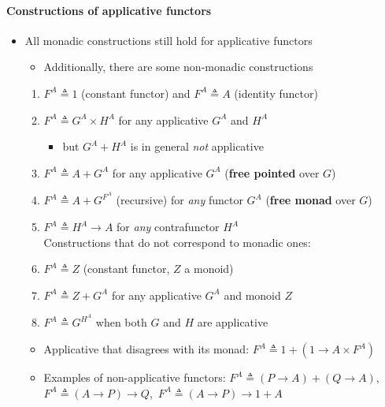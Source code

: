 \paragraph{Constructions of applicative functors}
\begin{itemize}
\item \vspace{-0.10cm}All monadic constructions still hold for applicative
functors
\begin{itemize}
\item Additionally, there are some non-monadic constructions
\end{itemize}
\begin{enumerate}
\item $F^{A}\triangleq1$ (constant functor) and $F^{A}\triangleq A$ (identity
functor)
\item $F^{A}\triangleq G^{A}\times H^{A}$ for any applicative $G^{A}$
and $H^{A}$
\begin{itemize}
\item but $G^{A}+H^{A}$ is in general \emph{not} applicative
\end{itemize}
\item $F^{A}\triangleq A+G^{A}$ for any applicative $G^{A}$ (\textbf{free
pointed} over $G$)
\item $F^{A}\triangleq A+G^{F^{A}}$ (recursive) for \emph{any} functor
$G^{A}$ (\textbf{free monad} over $G$)
\item $F^{A}\triangleq H^{A}\rightarrow A$ for \emph{any} contrafunctor
$H^{A}$\\
Constructions that do not correspond to monadic ones:
\item $F^{A}\triangleq Z$ (constant functor, $Z$ a monoid)
\item $F^{A}\triangleq Z+G^{A}$ for any applicative $G^{A}$ and monoid
$Z$
\item $F^{A}\triangleq G^{H^{A}}$ when both $G$ and $H$ are applicative
\end{enumerate}
\begin{itemize}
\item Applicative that disagrees with its monad: $F^{A}\triangleq1+\left(1\rightarrow A\times F^{A}\right)$ 
\item Examples of non-applicative functors: $F^{A}\triangleq\left(P\rightarrow A\right)+\left(Q\rightarrow A\right)$,
$F^{A}\triangleq\left(A\rightarrow P\right)\rightarrow Q$,\  $F^{A}\triangleq\left(A\rightarrow P\right)\rightarrow1+A$
\end{itemize}
\end{itemize}


